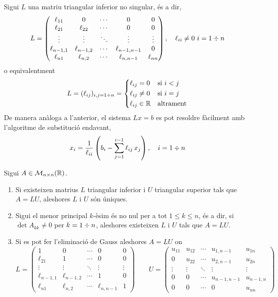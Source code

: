 Sigui $L$ una matriu triangular inferior no singular, és a dir, 
\[
	L = 
	\begin{pmatrix}
		\ell_{11} 		& 0 			& \cdots & 0 				& 0  \\
		\ell_{21} 		& \ell_{22} 	& \cdots & 0 				& 0 \\
		\vdots 			& \vdots 		& \ddots & \vdots 	  		& \vdots \\
		\ell_{n-1,1} 	& \ell_{n-1,2} 	& \cdots & \ell_{n-1,n-1} 	& 0 \\
		\ell_{n1} 		& \ell_{n,2} 	& \cdots & \ell_{n,n-1} 	& \ell_{nn}
	\end{pmatrix},
	\quad
	\ell_{ii} \neq 0 \ i = 1 \divisionsymbol n
\]
o equivalentment
\[
	L = (\ell_{ij})_{i, j= 1 \divisionsymbol n} = 
	\left\{
	\begin{aligned}
		&\ell_{ij} = 0 			& 	&\text{si } i < j \\
		&\ell_{ij} \neq 0 		& 	&\text{si } i = j \\
		&\ell_{ij} \in \real 	& 	&\text{altrament} 
	\end{aligned}
	\right.
\]
De manera anàloga a l'anterior, el sistema $L x = b$ es pot resoldre fàcilment amb l'algoritme de substitució endavant,
\[
	x_i = 
	\frac{1}{\ell_{ii}} 
	\left(
	b_i - \sum_{j=1}^{i-1} \ell_{ij} \, x_j
	\right),
	\quad
	i = 1 \divisionsymbol n
\]

\begin{theorem}
	Sigui $A \in \mathcal{M}_{n \times n}(\mathbb{R})$.
	\begin{enumerate}[label={(\arabic*)}]
		\item Si existeixen matrius $L$ triangular inferior i $U$ triangular superior tals que $A = L U$, aleshores $L$ i $U$ són úniques.
		\item Sigui el menor principal $k$-èsim és no nul per a tot $1 \leq k \leq n$, és a dir, si $\det A_{kk} \neq 0$ per $k = 1 \divisionsymbol n$, aleshores existeixen $L$ i $U$ tals que $A = L U$.
		\item Si es pot fer l'eliminació de Gauss aleshores $A = L U$ on
		\[			
			L = 
			\begin{pmatrix}
				1 				& 0 			& \cdots & 0 				& 0  \\
				\ell_{21} 		& 1 			& \cdots & 0 				& 0 \\
				\vdots 			& \vdots 		& \ddots & \vdots 	  		& \vdots \\
				\ell_{n-1,1} 	& \ell_{n-1,2} 	& \cdots & 1 				& 0 \\
				\ell_{n1} 		& \ell_{n,2} 	& \cdots & \ell_{n,n-1} 	& 1
			\end{pmatrix}
			\qquad			
			U = 
			\begin{pmatrix}
				u_{11} 	& u_{12} & \cdots & u_{1,n-1} & u_{1n} \\
				0		& u_{22} & \cdots & u_{2,n-1} & u_{2n} \\
				\vdots	& \vdots & \ddots & \vdots 	  & \vdots \\
				0 		& 0		 & \cdots & u_{n-1,n-1} & u_{n-1,n} \\
				0 	   	& 0		 & \cdots & 0 			& u_{nn}
			\end{pmatrix}			
		\] 
	\end{enumerate}
\end{theorem}

